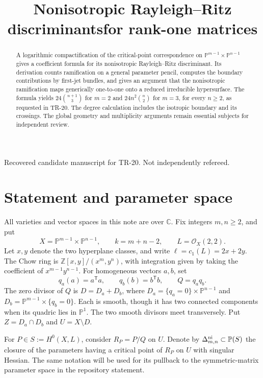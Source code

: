 \documentclass[11pt]{article}
\title{Nonisotropic Rayleigh--Ritz discriminants\newline for rank-one matrices}
\author{}
\date{}
\newcommand{\C}{\mathbb C}
\newcommand{\PP}{\mathbb P}
\newcommand{\OO}{\mathcal O}
\begin{document}
\maketitle
\begin{center}\small Recovered candidate manuscript for TR-20. Not independently refereed.\end{center}
\begin{abstract}
A logarithmic compactification of the critical-point correspondence
on $\PP^{m-1}\times\PP^{n-1}$ gives a coefficient formula for its
nonisotropic Rayleigh--Ritz discriminant. Its derivation counts
ramification on a general parameter pencil, computes the boundary
contributions by first-jet bundles, and gives an argument that the
nonisotropic ramification maps generically one-to-one onto a reduced
irreducible hypersurface. The formula yields
$24\binom{n+1}{3}$ for $m=2$ and $24n^2\binom n2$ for $m=3$, for every
$n\ge2$, as requested in TR-20. The degree calculation includes the
isotropic boundary and its crossings. The global geometry and
multiplicity arguments remain essential subjects for independent review.
\end{abstract}

\section{Statement and parameter space}
All varieties and vector spaces in this note are over $\C$.
Fix integers $m,n\ge2$, and put
\[
 X=\PP^{m-1}\times\PP^{n-1},\qquad k=m+n-2,\qquad L=\OO_X(2,2).
\]
Let $x,y$ denote the two hyperplane classes, and write
$\ell=c_1(L)=2x+2y$. The Chow ring is
$\mathbb Z[x,y]/(x^m,y^n)$, with integration given by taking the
coefficient of $x^{m-1}y^{n-1}$.
For homogeneous vectors $a,b$, set
\[
 q_a(a)=a^{\mathsf T}a,\qquad q_b(b)=b^{\mathsf T}b,\qquad Q=q_aq_b.
\]
The zero divisor of $Q$ is $D=D_a+D_b$, where
$D_a=\{q_a=0\}\times\PP^{n-1}$ and
$D_b=\PP^{m-1}\times\{q_b=0\}$. Each is smooth, though it has two
connected components when its quadric lies in $\PP^1$. The two
smooth divisors meet transversely. Put $Z=D_a\cap D_b$ and $U=X\setminus D$.

For $P\in S:=H^0(X,L)$, consider $R_P=P/Q$ on $U$. Denote by
$\Delta^{\rm ni}_{m,n}\subset\PP(S)$ the closure of the parameters
having a critical point of $R_P$ on $U$ with singular Hessian.
The same notation will be used for its pullback to the symmetric-matrix
parameter space in the repository statement.
\end{document}
